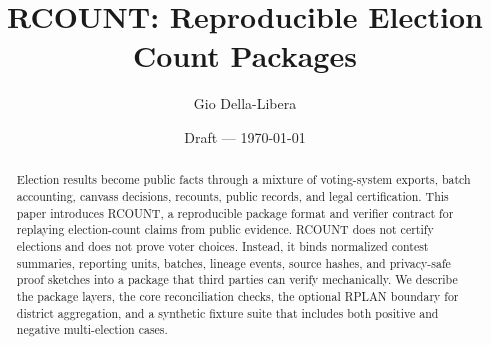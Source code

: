 \documentclass[12pt]{article}
\title{RCOUNT: Reproducible Election Count Packages}
\author{Gio Della-Libera}
\date{Draft --- \today}
\begin{document}
\maketitle

\begin{abstract}
Election results become public facts through a mixture of voting-system exports,
batch accounting, canvass decisions, recounts, public records, and legal
certification. This paper introduces RCOUNT, a reproducible package format and
verifier contract for replaying election-count claims from public evidence.
RCOUNT does not certify elections and does not prove voter choices. Instead, it
binds normalized contest summaries, reporting units, batches, lineage events,
source hashes, and privacy-safe proof sketches into a package that third parties
can verify mechanically. We describe the package layers, the core reconciliation
checks, the optional RPLAN boundary for district aggregation, and a synthetic
fixture suite that includes both positive and negative multi-election cases.
\end{abstract}










\nocite{rcount-substrate-2026,rplan-substrate-2026}


\end{document}
